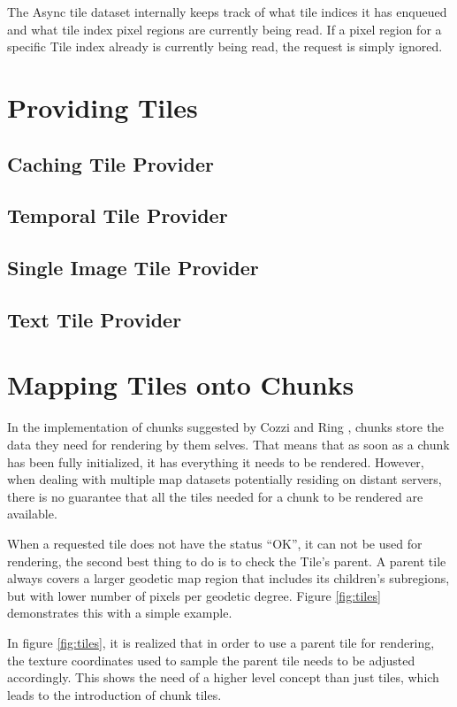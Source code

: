 The Async tile dataset internally keeps track of what tile indices it has enqueued and what tile index pixel regions are currently being read. If a pixel region for a specific Tile index already is currently being read, the request is simply ignored.


\section{Providing Tiles}

\subsection{Caching Tile Provider}

\subsection{Temporal Tile Provider}

\subsection{Single Image Tile Provider}

\subsection{Text Tile Provider}


\section{Mapping Tiles onto Chunks}

In the implementation of chunks suggested by Cozzi and Ring \cite{cozzi11}, chunks store the data they need for rendering by them selves. That means that as soon as a chunk has been fully initialized, it has everything it needs to be rendered. However, when dealing with multiple map datasets potentially residing on distant servers, there is no guarantee that all the tiles needed for a chunk to be rendered are available.

When a requested tile does not have the status ``OK'', it can not be used for rendering, the second best thing to do is to check the Tile's parent. A parent tile always covers a larger geodetic map region that includes its children's subregions, but with lower number of pixels per geodetic degree. Figure \ref{fig:tiles} demonstrates this with a simple example.

In figure \ref{fig:tiles}, it is realized that in order to use a parent tile for rendering, the texture coordinates used to sample the parent tile needs to be adjusted accordingly. This shows the need of a higher level concept than just tiles, which leads to the introduction of chunk tiles.

